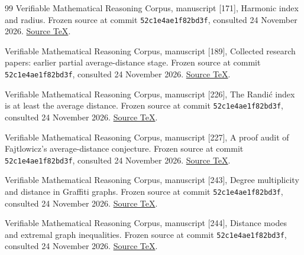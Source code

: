 \documentclass[11pt,a4paper]{article}
\theoremstyle{remark}\newtheorem{remark}[theorem]{Remark}
\begin{document}
\begin{thebibliography}{99}
Verifiable Mathematical Reasoning Corpus, manuscript [171], Harmonic index and radius.
Frozen source at commit \texttt{52c1e4ae1f82bd3f}, consulted 24 November 2026. \href{https://github.com/QEEDDD/Verifiable-Mathematical-Reasoning-Corpus/blob/52c1e4ae1f82bd3fdc8b809b9a94e2e4c6ef4cb3/\%5B171\%5D\%20Harmonic\_Radius\_Master\_Theorem.tex}{Source TeX}.

Verifiable Mathematical Reasoning Corpus, manuscript [189], Collected research papers: earlier partial average-distance stage.
Frozen source at commit \texttt{52c1e4ae1f82bd3f}, consulted 24 November 2026. \href{https://github.com/QEEDDD/Verifiable-Mathematical-Reasoning-Corpus/blob/52c1e4ae1f82bd3fdc8b809b9a94e2e4c6ef4cb3/\%5B189\%5D\%20Collected\_Research\_Papers.tex}{Source TeX}.

Verifiable Mathematical Reasoning Corpus, manuscript [226], The Randi\'c index is at least the average distance.
Frozen source at commit \texttt{52c1e4ae1f82bd3f}, consulted 24 November 2026. \href{https://github.com/QEEDDD/Verifiable-Mathematical-Reasoning-Corpus/blob/52c1e4ae1f82bd3fdc8b809b9a94e2e4c6ef4cb3/\%5B226\%5D\%20Fajtlowicz\_Average\_Distance\_Proof.tex}{Source TeX}.

Verifiable Mathematical Reasoning Corpus, manuscript [227], A proof audit of Fajtlowicz's average-distance conjecture.
Frozen source at commit \texttt{52c1e4ae1f82bd3f}, consulted 24 November 2026. \href{https://github.com/QEEDDD/Verifiable-Mathematical-Reasoning-Corpus/blob/52c1e4ae1f82bd3fdc8b809b9a94e2e4c6ef4cb3/\%5B227\%5D\%20Fajtlowicz\_Proof\_Audit.tex}{Source TeX}.

Verifiable Mathematical Reasoning Corpus, manuscript [243], Degree multiplicity and distance in Graffiti graphs.
Frozen source at commit \texttt{52c1e4ae1f82bd3f}, consulted 24 November 2026. \href{https://github.com/QEEDDD/Verifiable-Mathematical-Reasoning-Corpus/blob/52c1e4ae1f82bd3fdc8b809b9a94e2e4c6ef4cb3/\%5B243\%5D\%20Graffiti\_Degree\_Multiplicity\_and\_Distance.tex}{Source TeX}.

Verifiable Mathematical Reasoning Corpus, manuscript [244], Distance modes and extremal graph inequalities.
Frozen source at commit \texttt{52c1e4ae1f82bd3f}, consulted 24 November 2026. \href{https://github.com/QEEDDD/Verifiable-Mathematical-Reasoning-Corpus/blob/52c1e4ae1f82bd3fdc8b809b9a94e2e4c6ef4cb3/\%5B244\%5D\%20Graph\_Distance\_Modes\_and\_Extrema.tex}{Source TeX}.

\end{thebibliography}
\end{document}
